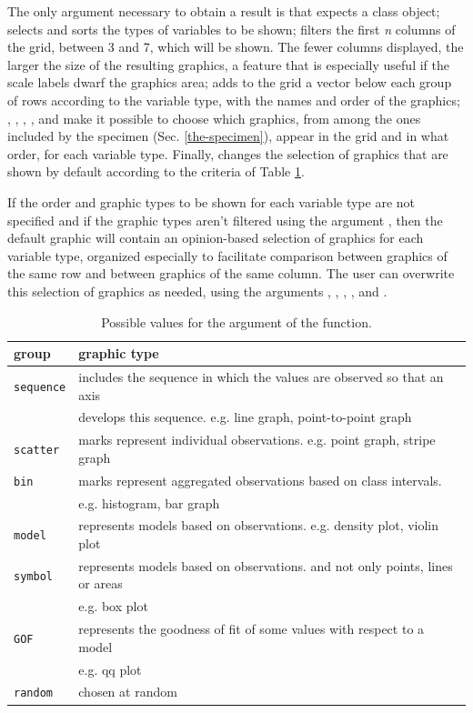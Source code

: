 The only argument necessary to obtain a result is  that
expects a  class object;  selects and
sorts the types of variables to be shown;  filters the first
\emph{n} columns of the grid, between 3 and 7, which will be shown. The
fewer columns displayed, the larger the size of the resulting graphics,
a feature that is especially useful if the scale labels dwarf the
graphics area;  adds to the grid a vector below each group
of rows according to the variable type, with the names and order of the
graphics; , , ,
,  and  make it possible to
choose which graphics, from among the ones included by the specimen
(Sec. \ref{the-specimen}), appear in the grid and in what order, for
each variable type. Finally,  changes the selection of
graphics that are shown by default according to the criteria of Table 
\ref{tab:table1}.

If the order and graphic types to be shown for each variable type are
not specified and if the graphic types aren't filtered using the
argument , then the default graphic will contain an
opinion-based selection of graphics for each variable type, organized
especially to facilitate comparison between graphics of the same row and
between graphics of the same column. The user can overwrite this
selection of graphics as needed, using the arguments ,
, , ,  and
.

\begin{table}[h!]
	\begin{tabular}{ll}\toprule
\textbf{group} & \textbf{graphic type}\\\midrule
\texttt{sequence} & includes the sequence in which the values are observed so that an axis\\
& develops this sequence. e.g. line graph, point-to-point graph\\
\texttt{scatter} & marks represent individual observations. e.g. point graph, stripe graph\\
\texttt{bin} & marks represent aggregated observations based on class intervals.\\
& e.g. histogram, bar graph\\
\texttt{model} & represents models based on observations. e.g. density plot, violin plot\\
\texttt{symbol} & represents models based on observations. and not only points, lines or areas\\
& e.g. box plot\\
\texttt{GOF} & represents the goodness of fit of some values with respect to a model\\
& e.g. qq plot \\
\texttt{random} & chosen at random\\
\bottomrule
	\end{tabular}
	\caption{Possible values for the  argument of the  function.}
	\label{tab:table1}
\end{table}

